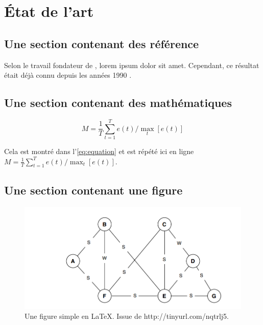 \chapter{État de l'art}

\section{Une section contenant des référence}

Selon le travail fondateur de \cite{Reference1}, lorem ipsum dolor sit amet.  
Cependant, ce résultat était déjà connu depuis les années 1990 \citep{Reference2,Reference3}.  


\section{Une section contenant des mathématiques}

\lipsum  %
 
\begin{equation}
M = \frac{1}{T}\sum_{t=1}^{T} e(t) / \max_{t}[e(t)]
\label{eq:equation}
\end{equation}

\lipsum  %

Cela est montré dans l'\autoref{eq:equation} et est répété ici en ligne $M = \frac{1}{T}\sum_{t=1}^{T} e(t) / \max_{t}[e(t)]$.


\section{Une section contenant une figure}

\lipsum  %

\begin{figure}[ht]
\includegraphics[width=15cm]{figures/figure1.png}
\caption{Une figure simple en \LaTeX. Issue de http://tinyurl.com/nqtrlj5.}
\label{fig:graph}
\end{figure}

